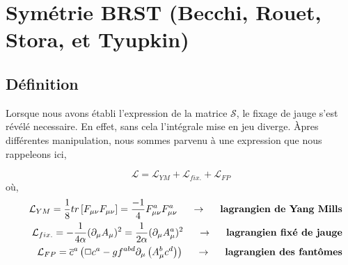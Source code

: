 \documentclass[a4paper,11pt]{article}
\theoremstyle{plain}
\theoremstyle{definition}
\theoremstyle{remark}
\numberwithin{equation}{section}
\numberwithin{equation}{subsection}
\numberwithin{figure}{section}
\begin{document}
\section{Symétrie BRST (Becchi, Rouet, Stora, et Tyupkin)}


\subsection{Définition}

\noindent
Lorsque nous avons établi l'expression de la matrice $\mathcal{S}$, le fixage de jauge s'est révélé necessaire. En effet, sans cela 
l'intégrale mise en jeu diverge. Àpres différentes manipulation, nous sommes parvenu à une expression que nous rappeleons ici,

\begin{equation}
 \mathcal{L} = \mathcal{L}_{YM} +\mathcal{L}_{fix.} +\mathcal{L}_{FP}
\end{equation}
où,
\begin{eqnarray}
 && \mathcal{L}_{YM} = \frac{1}{8} tr \left[ F_{\mu \nu}F_{\mu \nu} \right] = \frac{-1}{4} F^{a}_{\mu \nu}F^{a}_{\mu \nu}
\hspace{5mm} \rightarrow \hspace{5mm} \textbf{lagrangien de Yang Mills}\\
 && \mathcal{L}_{fix.} = - \frac{1}{4\alpha} (\partial_{\mu} A_{\mu})^{2} = \frac{1}{2\alpha} (\partial_{\mu} A^{a}_{\mu})^{2}
\hspace{5mm} \rightarrow \hspace{5mm} \textbf{lagrangien fixé de jauge}\\
 && \mathcal{L}_{FP} =  \overline{c}^{a} \left( \Box c^{a} -g f^{abd} \partial_{\mu} \left( A^{b}_{\mu} c^{d} \right) \right)
\hspace{5mm} \rightarrow \hspace{5mm} \textbf{lagrangien des fantômes}
\end{eqnarray}
\end{document}
